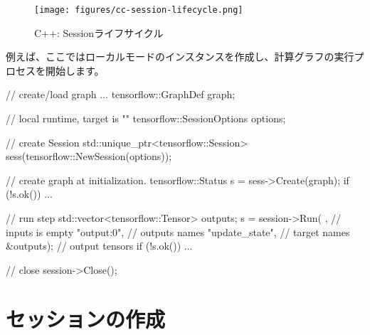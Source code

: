\begin{content}
\begin{enum}
\end{enum}

\begin{figure}[H]
\centering
\texttt{[image: figures/cc-session-lifecycle.png]}
\caption{C++: Sessionライフサイクル}
 \label{fig:cc-session-lifecycle}
\end{figure}

例えば、ここではローカルモードのインスタンスを作成し、計算グラフの実行プロセスを開始します。

\begin{leftbar}
\begin{c++}
// create/load graph ...
tensorflow::GraphDef graph;

// local runtime, target is ""
tensorflow::SessionOptions options;

// create Session
std::unique_ptr<tensorflow::Session> 
sess(tensorflow::NewSession(options));

// create graph at initialization.
tensorflow::Status s = sess->Create(graph);
if (!s.ok()) { ... }

// run step
std::vector<tensorflow::Tensor> outputs;
s = session->Run(
  {},               // inputs is empty
  {"output:0"},     // outputs names
  {"update_state"}, // target names
  &outputs);        // output tensors
if (!s.ok()) { ... }

// close
session->Close();
\end{c++}
\end{leftbar}

\end{content}

\section{セッションの作成}

